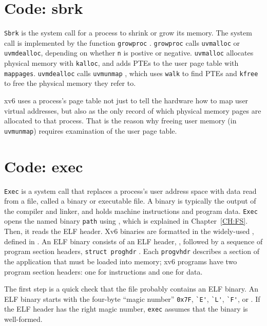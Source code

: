 \section{Code: sbrk}

\lstinline{Sbrk}
is the system call for a process to shrink or grow its memory. The system
call is implemented by the function
\lstinline{growproc}
.
\lstinline{growproc} calls \lstinline{uvmalloc} or
\lstinline{uvmdealloc}, depending on whether \lstinline{n} is postive
or negative.
\lstinline{uvmalloc}
allocates physical memory with {\tt kalloc},
and adds PTEs to the user page table with {\tt mappages}.
\lstinline{uvmdealloc} calls
{\tt uvmunmap}
,
which uses {\tt walk} to find PTEs and
{\tt kfree} to free the physical memory they refer to.

xv6 uses a process's page table not just to tell the hardware how to
map user virtual addresses, but also as the only record of which
physical memory pages are allocated to that process. That is the
reason why freeing user memory (in {\tt uvmunmap}) requires
examination of the user page table.

\section{Code: exec}
\lstinline{Exec} is a system call that replaces a process's
user address space with data read from a file, called a binary
or executable file.
A binary is typically the output of the compiler and linker,
and holds machine instructions and program data.
\lstinline{Exec}  opens the
named binary \lstinline{path} using 
, which is explained in
Chapter~\ref{CH:FS}.  Then, it reads the ELF header. Xv6 binaries
are formatted in the widely-used , defined in
.  An ELF binary consists of an ELF header,
 ,
followed by a sequence of program section headers,
\lstinline{struct proghdr} .  Each
\lstinline{progvhdr} describes a section of the application that must
be loaded into memory; xv6 programs have two program section
headers: one for instructions and one for data.

The first step is a quick check that the file probably contains an
ELF binary.
An ELF binary starts with the four-byte ``magic number''
\lstinline{0x7F},
\lstinline{`E'},
\lstinline{`L'},
\lstinline{`F'},
or
.
If the ELF header has the right magic number,
\lstinline{exec}
assumes that the binary is well-formed.


